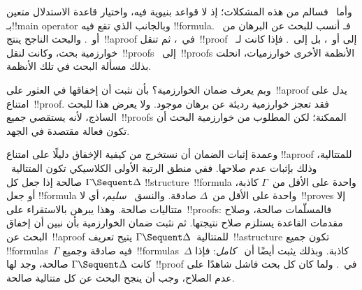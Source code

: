 \documentclass[../../../include/open-logic-section]{subfiles}
\begin{document}
وأما~ فسالم من هذه المشكلات؛ إذ لا قواعد بنيوية فيه، واختيار
قاعدة الاستدلال متعين بـ!!{main operator} وبالجانب الذي تقع فيه
!!{formula}. فـ أنسب للبحث عن البرهان من~ أو~.
والبحث الناجح ينتج~!!a{proof} في~، ثم تنقل~!!{proof} إلى
 أو~، بل إلى~. فإذا كانت لـ~
خوارزمية بحث، وكانت لنقل~!!{proof}s~ إلى~!!{proof}s الأنظمة
الأخرى خوارزميات، انحلت بذلك مسألة البحث في تلك الأنظمة.

وبم يعرف ضمان الخوارزمية؟ بأن نثبت أن إخفاقها في العثور على~!!a{proof}
يدل على امتناع~!!{proof}. فقد تعجز خوارزمية رديئة عن برهان موجود. ولا
يعرض هذا للبحث الساذج، لأنه يستقصي جميع~!!{proof}s الممكنة؛ لكن المطلوب
من خوارزمية البحث أن تكون فعالة مقتصدة في الجهد.

وعمدة إثبات الضمان أن نستخرج من كيفية الإخفاق دليلًا على امتناع
!!a{proof} للمتتالية، وذلك بإثبات عدم صلاحها. ففي منطق الرتبة الأولى
الكلاسيكي تكون المتتالية~$\Gamma\Sequent\Delta$ صالحة إذا جعل كل
!!{structure}~!!{formula} واحدة على الأقل من~$\Gamma$ كاذبة، أو جعل
!!{formula} واحدة على الأقل من~$\Delta$ صادقة. والنسق~
\emph{سليم}، أي لا~!!{prove}s إلا متتاليات صالحة. وهذا يبرهن بالاستقراء
على~!!{proof}s: فالمسلّمات صالحة، وصلاح مقدمات القاعدة يستلزم صلاح
نتيجتها. ثم نثبت ضمان الخوارزمية بأن نبين أن إخفاق البحث عن~!!a{proof}
للمتتالية~$\Gamma\Sequent\Delta$ يتيح تعريف~!!a{structure} تكون جميع
!!{formula}s~$\Gamma$ فيه صادقة وجميع~!!{formula}s~$\Delta$ كاذبة.
وبذلك يثبت أيضًا أن~ \emph{كامل}: فإذا كانت
$\Gamma\Sequent\Delta$ صالحة، وجد لها~!!{proof} في~. ولما كان
كل بحث فاشل شاهدًا على عدم الصلاح، وجب أن ينجح البحث عن كل متتالية صالحة.
\end{document}
